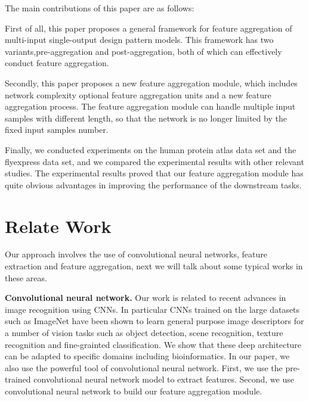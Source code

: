 \documentclass[10pt,twocolumn,letterpaper]{article}
\begin{document}
The main contributions of this paper are as follows:

First of all, this paper proposes a general framework for feature aggregation of multi-input single-output design pattern models. This framework has two variants,pre-aggregation and post-aggregation, both of which can effectively conduct feature aggregation.

Secondly, this paper proposes a new feature aggregation module, which includes network complexity optional feature aggregation units and a new feature aggregation process. The feature aggregation module can handle multiple input samples with different length, so that the network is no longer limited by the fixed input samples number.

Finally, we conducted experiments on the human protein atlas data set and the flyexpress data set, and we compared the experimental results with other relevant studies. The experimental results proved that our feature aggregation module has quite obvious advantages in improving the performance of the downstream tasks.

\section{Relate Work}
Our approach involves the use of convolutional neural networks, feature extraction and feature aggregation, next we will talk about some typical works in these areas.

\textbf{Convolutional neural network.} Our work is related to recent advances in image recognition using CNNs\cite{ref1}. In particular CNNs trained on the large datasets such as ImageNet have been shown to learn general purpose image descriptors for a number of vision tasks such as object detection, scene recognition, texture recognition and fine-grainted classification\cite{ref4, ref15, ref16, ref17}. We show that these deep architecture can be adapted to specific domains including bioinformatics. In our paper, we also use the powerful tool of convolutional neural network. First, we use the pre-trained convolutional neural network model to extract features. Second, we use convolutional neural network to build our feature aggregation module.
\end{document}
